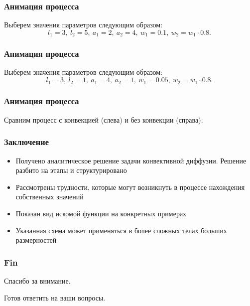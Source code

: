 \documentclass[10pt,pdf,hyperref={unicode}]{beamer}
\begin{document}
\begin{frame}
 \frametitle{Анимация процесса}
 Выберем значения параметров следующим образом:
  \begin{equation*}
    l_1=3,\ l_2=5,\ a_1=2,\ a_2=4,\ w_1=0.1,\ w_2=w_1 \cdot 0.8.
  \end{equation*}
 \begin{center}
 \end{center}
\end{frame}


\begin{frame}
 \frametitle{Анимация процесса}
 Выберем значения параметров следующим образом:
  \begin{equation*}
    l_1=3,\ l_2=1,\ a_1=4,\ a_2=1,\ w_1=0.05,\ w_2=w_1 \cdot 0.8.
  \end{equation*}
 \begin{center}
 \end{center}
\end{frame}

\begin{frame}
 \frametitle{Анимация процесса}
 Сравним процесс с конвекцией (слева) и без конвекции (справа):
 \begin{center}
 \end{center}
\end{frame}

\begin{frame}
  \frametitle{Заключение}
  \begin{itemize}
    \item Получено аналитическое решение задачи конвективной диффузии. Решение разбито на этапы и структурировано
    \item Рассмотрены трудности, которые могут возникнуть в процессе нахождения собственных значений
    \item Показан вид искомой функции на конкретных примерах
    \item Указанная схема может применяться в более сложных телах больших размерностей
  \end{itemize}
\end{frame}

\begin{frame}
  \frametitle{Fin}
  \begin{center}
    Спасибо за внимание.

    Готов ответить на ваши вопросы.
  \end{center}
\end{frame}
\end{document}
